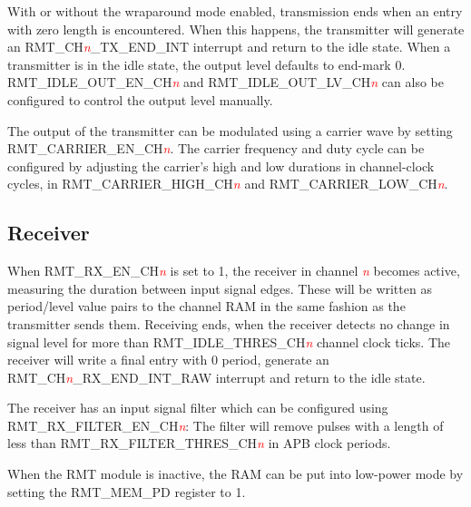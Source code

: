\documentclass[main\_\_EN.tex]{subfiles}
\begin{document}
With or without the wraparound mode enabled, transmission ends when an entry with zero length is encountered. When this happens, the transmitter will generate an RMT\_CH\textcolor{red}{\it{n}}\_TX\_END\_INT interrupt and return to the idle state. When a transmitter is in the idle state, the output level defaults to end-mark 0. RMT\_IDLE\_OUT\_EN\_CH\textcolor{red}{\it{n}} and RMT\_IDLE\_OUT\_LV\_CH\textcolor{red}{\it{n}} can also be configured to control the output level manually.

The output of the transmitter can be modulated using a carrier wave by setting RMT\_CARRIER\_EN\_CH\textcolor{red}{\it{n}}. The carrier frequency and duty cycle can be configured by adjusting the carrier's high and low durations in channel-clock cycles, in RMT\_CARRIER\_HIGH\_CH\textcolor{red}{\it{n}} and RMT\_CARRIER\_LOW\_CH\textcolor{red}{\it{n}}.

\subsection{Receiver}
When RMT\_RX\_EN\_CH\textcolor{red}{\it{n}} is set to 1, the receiver in channel \textcolor{red}{\it{n}} becomes active, measuring the duration between input signal edges. These will be written as period/level value pairs to the channel RAM in the same fashion as the transmitter sends them. Receiving ends, when the receiver detects no change in signal level for more than RMT\_IDLE\_THRES\_CH\textcolor{red}{\it{n}} channel clock ticks. The receiver will write a final entry with 0 period, generate an RMT\_CH\textcolor{red}{\it{n}}\_RX\_END\_INT\_RAW interrupt and return to the idle state.

The receiver has an input signal filter which can be configured using RMT\_RX\_FILTER\_EN\_CH\textcolor{red}{\it{n}}: The filter will remove pulses with a length of less than RMT\_RX\_FILTER\_THRES\_CH\textcolor{red}{\it{n}} in APB clock periods.

When the RMT module is inactive, the RAM can be put into low-power mode by setting the RMT\_MEM\_PD register to 1.
\end{document}
